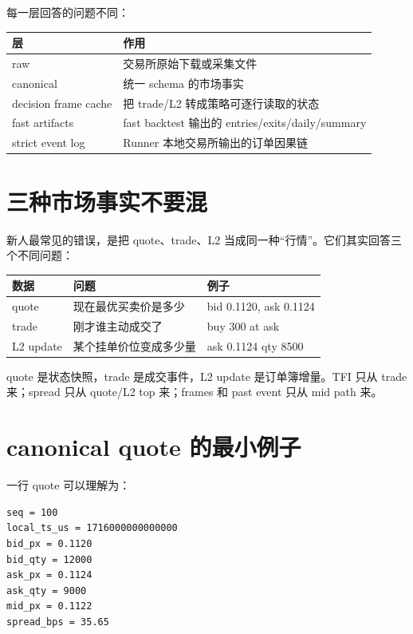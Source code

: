 每一层回答的问题不同：

\begin{longtable}{p{}p{}}
\toprule
层 & 作用 \\
\midrule
raw & 交易所原始下载或采集文件 \\
canonical & 统一 schema 的市场事实 \\
decision frame cache & 把 trade/L2 转成策略可逐行读取的状态 \\
fast artifacts & fast backtest 输出的 entries/exits/daily/summary \\
strict event log & Runner 本地交易所输出的订单因果链 \\
\bottomrule
\end{longtable}


\section{三种市场事实不要混}

新人最常见的错误，是把 quote、trade、L2 当成同一种“行情”。它们其实回答三个不同问题：

\begin{longtable}{p{}p{}p{}}
\toprule
数据 & 问题 & 例子 \\
\midrule
quote & 现在最优买卖价是多少 & bid 0.1120, ask 0.1124 \\
trade & 刚才谁主动成交了 & buy 300 at ask \\
L2 update & 某个挂单价位变成多少量 & ask 0.1124 qty 8500 \\
\bottomrule
\end{longtable}

quote 是状态快照，trade 是成交事件，L2 update 是订单簿增量。TFI 只从 trade 来；spread 只从 quote/L2 top 来；frames 和 past event 只从 mid path 来。

\section{canonical quote 的最小例子}

一行 quote 可以理解为：

\begin{lstlisting}
seq = 100
local_ts_us = 1716000000000000
bid_px = 0.1120
bid_qty = 12000
ask_px = 0.1124
ask_qty = 9000
mid_px = 0.1122
spread_bps = 35.65
\end{lstlisting}

